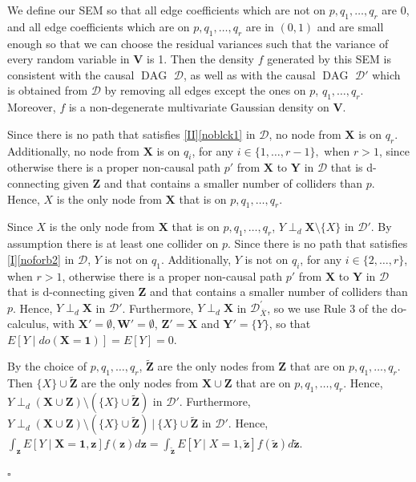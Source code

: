 \documentclass[11pt,a4paper]{article}
\newcommand\given[1][]{\:#1\vert\:}
\newcommand{\dsepp}{\perp_{d}}
\newenvironment{proofof}[1][]{\begin{trivlist}
   \item[\hskip \labelsep {\bfseries Proof of #1.}]}{\hfill{}$\square$\end{trivlist}}
\DeclareMathOperator{\DAG}{DAG}
\newcommand{\g}[1][G]{\mathcal{#1}}
\begin{document}
\begin{proofof}[Theorem~\ref{theorem:completeness ac}]
\begin{enumerate}[label=(\roman*)]
{We define our SEM so that all edge coefficients which are not on $p,q_1,\dots , q_r$ are $0$, and all edge coefficients which are on $p,q_1,\dots , q_r$ are in $(0,1)$ and are small enough so that we can choose the residual variances such that the variance of every random variable in $\mathbf{V}$ is 1. Then the density $f$ generated by this SEM is consistent with the causal $\DAG$ $\g[D]$, as well as with the causal $\DAG$ $\g[D']$ which is obtained from $\g[D]$ by removing all edges except the ones on $p$, $q_1, \dots , q_r$. {Moreover, $f$ is a non-degenerate multivariate Gaussian density on $\mathbf{V}$. }

Since there is no path that satisfies \ref{II}\ref{noblck1} in $\g[D]$, no node from $\mathbf{X}$ is on $q_r$. Additionally, no node from $\mathbf{X}$ is on $q_i$, for any $i \in \{1,\dots,r-1\},$ when $r >1$, since otherwise there is a proper non-causal path $p'$ from $\mathbf{X}$ to $\mathbf{Y}$ in $\g[D]$ that is d-connecting given $\mathbf{Z}$ and that contains a smaller number of colliders than $p$. Hence, $X$ is the only node from $\mathbf{X}$ that is on $p,q_1,\dots,q_r$.

Since $X$ is the only node from $\mathbf{X}$ that is on $p,q_1,\dots,q_r$, $Y \dsepp \mathbf{X} \setminus \{X\}$ in $\g[D']$. By assumption there is at least one collider on $p$. Since there is no path that satisfies \ref{I}\ref{noforb2} in $\g[D]$, $Y$ is not on $q_1$. Additionally, $Y$ is not on $q_i$, for any $i \in \{2,\dots,r\}$, when $r >1$, otherwise there is a proper non-causal path $p'$ from $\mathbf{X}$ to $\mathbf{Y}$ in $\g[D]$ that is d-connecting given $\mathbf{Z}$ and that contains a smaller number of colliders than $p$. Hence, $Y \dsepp \mathbf{X}$ in $\g[D']$. Furthermore, $Y \dsepp \mathbf{X}$ in $\g[D]^{'}_{\overline{X}}$, so we use Rule 3 of the do-calculus, with $\mathbf{X'} = \emptyset, \mathbf{W'} = \emptyset$, $\mathbf{Z'} = \mathbf{X}$ and $ \mathbf{Y'} = \{Y\}$, so that $E[ Y \mid do(\mathbf{X}=\mathbf{1})]= E[ Y]=0$.

By the choice of $p,q_1,\dots,q_r$, $\mathbf{\tilde{Z}}$ are the only nodes from $\mathbf{Z}$ that are on $p,q_1,\dots, q_r$. Then  $\{X\} \cup \mathbf{\tilde{Z}}$ are the only nodes from $\mathbf{X} \cup \mathbf{Z}$ that are on $p,q_1,\dots, q_r$. Hence, $Y \dsepp (\mathbf{X} \cup \mathbf{Z}) \setminus ( \{X\} \cup \mathbf{\tilde{Z}})$ in $\g[D']$. Furthermore, $Y \dsepp (\mathbf{X} \cup \mathbf{Z}) \setminus ( \{X\} \cup \mathbf{\tilde{Z}}) \given  \{X\} \cup \mathbf{\tilde{Z}}$ in $\g[D']$. Hence, $\int_{\mathbf{z}}E[Y\mid \mathbf{X=1},\mathbf{z}]f(\mathbf{z})d\mathbf{z} = \int_{\mathbf{\tilde{z}}}E[Y\mid X=1,\mathbf{\tilde{z}}]f(\mathbf{\tilde{z}})d\mathbf{\tilde{z}}$.

}
\end{enumerate}
\end{proofof}
\end{document}
